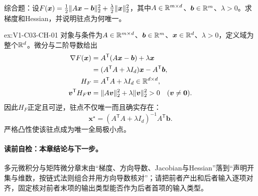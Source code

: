 \begin{SLChapterExercisePairSection}
\begin{exercise}[章末综合]\label{ex:V1-C03-CH-01}
综合题：设$F(\boldsymbol x)=\frac12\lVert A\boldsymbol x-\boldsymbol b\rVert_2^2+\frac{\lambda}{2}\lVert\boldsymbol x\rVert_2^2$，其中$A\in\mathbb{R}^{m\times d}$、$\boldsymbol b\in\mathbb{R}^m$、$\lambda>0$。求梯度和Hessian，并说明驻点为何唯一。
\end{exercise}
\label{sol:V1-C03-CH-01}
\begin{chapterexercisesolution}{ex:V1-C03-CH-01}
对象与条件为$A\in\mathbb{R}^{m\times d}$、$\boldsymbol b\in\mathbb{R}^m$、$\boldsymbol x\in\mathbb{R}^d$、$\lambda>0$，定义域为整个$\mathbb{R}^d$。微分与二阶导数给出
\[
\begin{aligned}
\nabla F(\boldsymbol x)
&=A^{\mathsf T}(A\boldsymbol x-\boldsymbol b)+\lambda\boldsymbol x\\
&=(A^{\mathsf T}A+\lambda I_d)\boldsymbol x-A^{\mathsf T}\boldsymbol b,\\
H_F&=A^{\mathsf T}A+\lambda I_d\in\mathbb{R}^{d\times d},\\
\boldsymbol v^{\mathsf T}H_F\boldsymbol v
&=\lVert A\boldsymbol v\rVert_2^2+\lambda\lVert\boldsymbol v\rVert_2^2>0
\quad(\boldsymbol v\ne\boldsymbol0).
\end{aligned}
\]
因此$H_F$正定且可逆，驻点不仅唯一而且确实存在：
\[
\boldsymbol x^\star=(A^{\mathsf T}A+\lambda I_d)^{-1}A^{\mathsf T}\boldsymbol b.
\]
严格凸性使该驻点成为唯一全局极小点。
\end{chapterexercisesolution}

\end{SLChapterExercisePairSection}
\paragraph{读前自检：本章结论与下一步。}多元微积分与矩阵微分章末由“梯度、方向导数、Jacobian与Hessian”落到“声明开集与维数，按链式法则组合并用方向导数核对”；请把前者产出和后者输入逐项对齐，固定核对前者末项的输出类型能否作为后者首项的输入类型。\par


